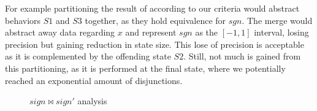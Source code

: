 For example partitioning the result of  according to our criteria would abstract behaviors $S1$ and $S3$ together, as they hold equivalence for $sgn$. The merge would abstract away data regarding $x$ and represent $sgn$ as the $[-1,1]$ interval, losing precision but gaining reduction in state size. This lose of precision is acceptable as it is complemented by the offending state $S2$. Still, not much is gained from this partitioning, as it is performed at the final state, where we potentially reached an exponential amount of disjunctions. 
\begin{figure}
\caption{$sign \bowtie sign'$ analysis}
\end{figure}
